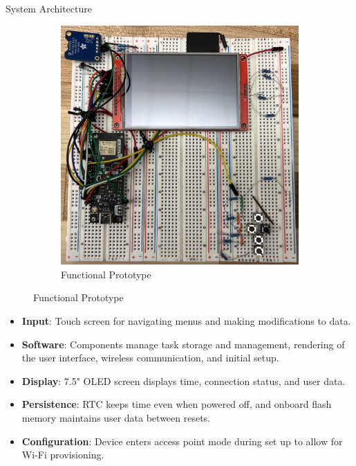 \documentclass[final]{beamer}
\newlength{\colwidth}
\begin{document}
\begin{frame}[t]
\begin{columns}[t]
\begin{column}{\colwidth}
\begin{block}{System Architecture}
\begin{figure}
\begin{subfigure}[t]{0.44\textwidth}
              \includegraphics[width=\textwidth]{prototype.jpg}
              \caption{Functional Prototype}
          \end{subfigure}
        \end{figure}

        \begin{itemize}
          \item \textbf{Input}: Touch screen for navigating menus and
            making modifications to data.
          \item \textbf{Software}: Components manage task storage and
            management, rendering of the user interface, wireless
            communication, and initial setup.
          \item \textbf{Display}: 7.5" OLED screen displays time, connection status,
            and user data.
          \item \textbf{Persistence}: RTC keeps time even 
            when powered off, and onboard flash memory maintains user data
            between resets.
          \item \textbf{Configuration}: Device enters access point mode during set up to allow for Wi-Fi provisioning.
        \end{itemize}
      \end{block}
         \end{column}


\end{columns}
\end{frame}
\end{document}
